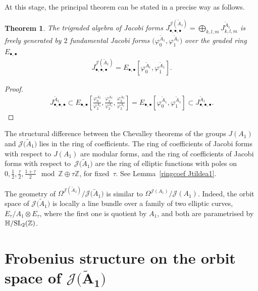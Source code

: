 \documentclass[10pt,a4paper]{amsart}
\numberwithin{equation}{section}
\newtheorem{Theorem}{Theorem}[section]
\newcommand{\Ja}{\mathcal{J}}
\begin{document}
At this stage, the principal theorem can be stated in a precise way as follows.

\begin{Theorem}\label{chevalley Jtildea1}
The trigraded algebra of Jacobi forms $J_{\bullet,\bullet,\bullet}^{\Ja(\tilde A_1)}=\bigoplus _{k,l,m}J_{k,l,m}^{\tilde A_1}$ is freely generated by $2$ fundamental Jacobi forms $\big(\varphi_0^{\tilde A_1},\varphi_1^{\tilde A_1}\big)$ over the graded ring $E_{\bullet,\bullet}$
\begin{gather*}
J_{\bullet,\bullet,\bullet}^{\Ja(\tilde A_1)}=E_{\bullet,\bullet}\left [\varphi_0^{\tilde A_1},\varphi_1^{\tilde A_1}\right ].
\end{gather*}
\end{Theorem}
\begin{proof}
\begin{gather*}
J_{\bullet,\bullet,\bullet}^{\tilde A_1}\subset E_{\bullet,\bullet}\left [\frac{\varphi_0^{A_{2}}}{\varphi_2^{A_1}},\frac{\varphi_2^{A_{2}}}{\varphi_2^{A_1}},\frac{\varphi_3^{A_{2}}}{\varphi_2^{A_1}}\right ]=E_{\bullet,\bullet}\left [\varphi_0^{\tilde A_1},\varphi_1^{\tilde A_1}\right ]\subset J_{\bullet,\bullet,\bullet}^{\tilde A_1}.
\tag*{\qed}
\end{gather*}
\renewcommand{\qed}{}
\end{proof}

\begin{Remark}
The structural difference between the Chevalley theorems of the groups $J(A_1)$ and $\Ja\big(\tilde A_1\big)$ lies in the ring of coefficients. The ring of coefficients of Jacobi forms with respect to $J(A_1)$ are modular forms, and the ring of coefficients of Jacobi forms with respect to~$\Ja\big(\tilde A_1\big)$
are the ring of elliptic functions with poles on $0, \frac{1}{2}, \frac{\tau}{2}, \frac{1+\tau}{2} \mod \mathbb{Z}\oplus\tau\mathbb{Z}$, for fixed~$\tau$.
See Lemma~\ref{ringcoef Jtildea1}.
\end{Remark}

\begin{Remark}The geometry of $\Omega^{\Ja(\tilde A_1)}/\Ja\big(\tilde A_1\big)$ is similar to $\Omega^{\Ja( A_1)}/\Ja( A_1)$. Indeed, the orbit space of $\Ja\big(\tilde A_1\big)$ is locally a line bundle over a family of two elliptic curves, $E_{\tau}/A_1\otimes E_{\tau}$, where the first one is quotient by $A_1$, and both are parametrised by $\mathbb{H}/{\rm SL}_2(\mathbb{Z})$.
\end{Remark}

\section[Frobenius structure on the orbit space of Ja(A1)]{Frobenius structure on the orbit space of $\boldsymbol{\Ja\big(\tilde A_1\big)}$}\label{Frobenius structure A1}
\end{document}
